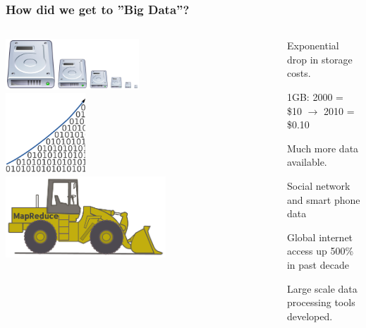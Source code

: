 \begin{frame}
\frametitle{How did we get to ''Big Data''?}

\begin{center}

\begin{columns}

\begin{column}{0.5\textwidth}
\begin{center}
\includegraphics[width=0.5\textwidth]{graphics/hard_drives1.pdf}\\
\bigskip
\bigskip
\includegraphics[width=0.3\textwidth]{graphics/data_increase.pdf}\\
\bigskip
\bigskip
\includegraphics[width=0.6\textwidth]{graphics/Loader.pdf}
\end{center}
\end{column}

\begin{column}{0.5\textwidth}
Exponential drop in storage costs.\\
\begin{itemize}
    \tiny{\item 1GB: 2000 = \$10 $\to$ 2010 = \$0.10}
\end{itemize}
\bigskip
\bigskip


Much more data available.\\
\begin{itemize}
    \tiny{\item Social network and smart phone data}
    \item \tiny{Global internet access up 500\% in past decade}
\end{itemize}
\bigskip
\bigskip
\bigskip

Large scale data processing tools developed.
\end{column}

\end{columns}

\end{center}

\end{frame}

